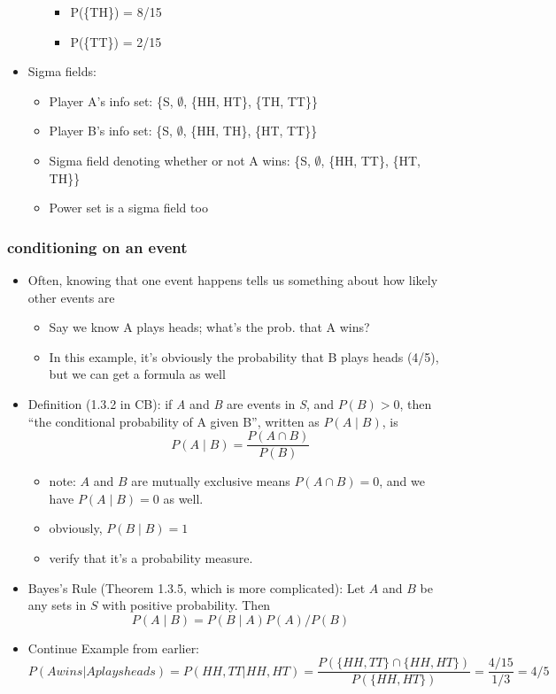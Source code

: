 \documentclass[11pt]{article}
\begin{document}
\begin{itemize}
\begin{itemize}
\begin{itemize}
\item P(\{TH\}) = 8/15
\item P(\{TT\}) = 2/15
\end{itemize}
\end{itemize}
\item Sigma fields:
\begin{itemize}
\item Player A's info set: \{S, $\emptyset$, \{HH, HT\}, \{TH, TT\}\}
\item Player B's info set: \{S, $\emptyset$, \{HH, TH\}, \{HT, TT\}\}
\item Sigma field denoting whether or not A wins: 
          \{S, $\emptyset$, \{HH, TT\}, \{HT, TH\}\}
\item Power set is a sigma field too
\end{itemize}
\end{itemize}
\subsubsection{conditioning on an event}
\label{sec-1-2-2}

\begin{itemize}
\item Often, knowing that one event happens tells us something about
        how likely other events are
\begin{itemize}
\item Say we know A plays heads; what's the prob. that A wins?
\item In this example, it's obviously the probability that B plays
          heads (4/5), but we can get a formula as well
\end{itemize}
\item Definition (1.3.2 in CB): if \emph{A} and \emph{B} are events in \emph{S},
        and $P(B) > 0$, then ``the conditional probability of A given
        B'', written as $P(A \mid B)$, is
        \[P(A \mid B) = \frac{P(A \cap B)}{P(B)}\]
\begin{itemize}
\item note: $A$ and $B$ are mutually exclusive means $P(A \cap
          B) = 0$, and we have $P(A \mid B) = 0$ as well.
\item obviously, $P(B \mid B) = 1$
\item verify that it's a probability measure.
\end{itemize}
\item Bayes's Rule (Theorem 1.3.5, which is more complicated):
        Let $A$ and $B$ be any sets in $S$ with positive probability.
        Then \[P(A \mid B) = P(B \mid A) P(A) / P(B)\]
\item Continue Example from earlier:
        \[P(A wins | A plays heads) = P({HH, TT} | {HH, HT}) =
        \frac{P(\{HH, TT\} \cap \{HH, HT\})}{P(\{HH, HT\})} =
        \frac{4/15}{1/3} = 4/5\]
\end{itemize}
\end{document}
